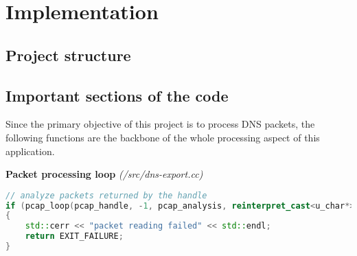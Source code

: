
\section{Implementation}

\subsection{Project structure}


\subsection{Important sections of the code}

Since the primary objective of this project is to process DNS packets, the following functions are the backbone of the whole processing aspect of this application.

\vspace{1cm}
\textbf{Packet processing loop} \textit{(/src/dns-export.cc)}
\begin{lstlisting}[language=C++] 
// analyze packets returned by the handle
if (pcap_loop(pcap_handle, -1, pcap_analysis, reinterpret_cast<u_char*>(&link_type)) != 0)
{
    std::cerr << "packet reading failed" << std::endl;
    return EXIT_FAILURE;
}
\end{lstlisting}

